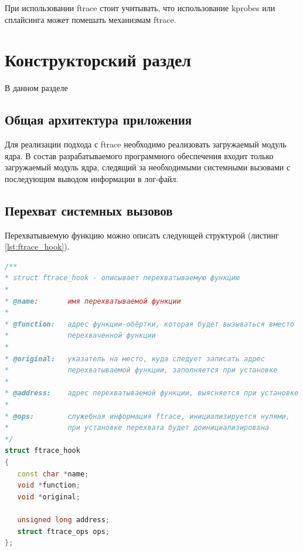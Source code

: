 \documentclass[a4paper,14pt]{article}
\begin{document}
При использовании ftrace стоит учитывать, что использование kprobes или сплайсинга может помешать меха­низмам ftrace.




\newpage
\section{Конструкторский раздел}

В данном разделе

\subsection{Общая архитектура приложения}

Для реализации подхода с ftrace необходимо реализовать загружаемый модуль ядра. В состав разрабатываемого программного обеспечения входит только загружаемый модуль ядра, следящий за необходимыми системными вызовами с последующим выводом информации в лог-файл.

\subsection{Перехват системных вызовов}

Перехватываемую функцию можно описать следующей структурой (листинг \ref{lst:ftrace_hook}).


\begin{lstlisting}[language=C++,label={lst:ftrace_hook}, caption=\text{ftrace\_hook.}]
/**
* struct ftrace_hook - описывает перехватываемую функцию
*
* @name:       имя перехватываемой функции
*
* @function:   адрес функции-обёртки, которая будет вызываться вместо
*              перехваченной функции
*
* @original:   указатель на место, куда следует записать адрес
*              перехватываемой функции, заполняется при установке
*
* @address:    адрес перехватываемой функции, выясняется при установке
*
* @ops:        служебная информация ftrace, инициализируется нулями,
*              при установке перехвата будет доинициализирована
*/
struct ftrace_hook
{
   const char *name;
   void *function;
   void *original;
   
   unsigned long address;
   struct ftrace_ops ops;
};   
\end{lstlisting}
\end{document}
